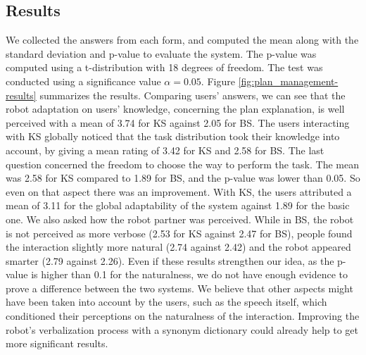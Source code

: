 \subsection{Results}

We collected the answers from each form, and computed the mean along with the standard deviation and p-value to evaluate the system. The p-value was computed using a t-distribution with 18 degrees of freedom. The test was conducted using a significance value $\alpha=0.05$.
Figure \ref{fig:plan_management-results} summarizes the results. Comparing users' answers, we can see that the robot adaptation on users' knowledge, concerning the plan explanation, is well perceived with a mean of 3.74 for KS against 2.05 for BS. The users interacting with KS globally noticed that the task distribution took their knowledge into account, by giving a mean rating of 3.42 for KS and 2.58 for BS. The last question concerned the freedom to choose the way to perform the task. The mean was 2.58 for KS compared to 1.89 for BS, and the p-value was lower than 0.05. So even on that aspect there was an improvement. 
With KS, the users attributed a mean of 3.11 for the global adaptability of the system against 1.89 for the basic one.
We also asked how the robot partner was perceived. While in BS, the robot is not perceived as more verbose (2.53 for KS against 2.47 for BS), people found the interaction slightly more natural (2.74 against 2.42) and the robot appeared smarter (2.79 against 2.26). Even if these results strengthen our idea, as the p-value is higher than 0.1 for the naturalness, we do not have enough evidence to prove a difference between the two systems. We believe that other aspects might have been taken into account by the users, such as the speech itself, which conditioned their perceptions on the naturalness of the interaction. Improving the robot's verbalization process with a synonym dictionary could already help to get more significant results.



